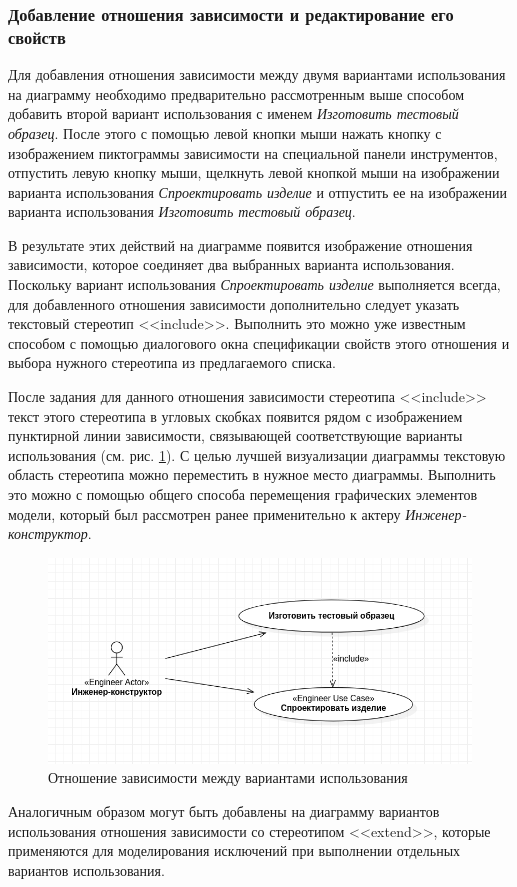 \documentclass[a4paper,12pt]{report}
\begin{document}
\subsubsection*{Добавление отношения зависимости и редактирование его свойств}
Для добавления отношения зависимости между двумя вариантами использования на диаграмму необходимо предварительно рассмотренным выше способом добавить второй вариант использования с именем \textit{Изготовить тестовый образец}. После этого с помощью левой кнопки мыши нажать кнопку с изображением пиктограммы зависимости на специальной панели инструментов, отпустить левую кнопку мыши, щелкнуть левой кнопкой мыши на изображении варианта использования \textit{Спроектировать изделие} и отпустить ее на изображении варианта использования \textit{Изготовить тестовый образец}. 

В результате этих действий на диаграмме появится изображение отношения зависимости, которое соединяет два выбранных варианта использования.
Поскольку вариант использования \textit{Спроектировать изделие} выполняется всегда, для добавленного отношения зависимости дополнительно следует указать текстовый стереотип <<include>>. Выполнить это можно уже известным способом с помощью диалогового окна спецификации свойств этого отношения и выбора нужного стереотипа из предлагаемого списка.

После задания для данного отношения зависимости стереотипа <<include>> текст этого стереотипа в угловых скобках появится рядом с изображением пунктирной линии зависимости, связывающей соответствующие варианты использования (см. рис. \ref{fig:actionsinclude}). С целью лучшей визуализации диаграммы текстовую область стереотипа можно переместить в нужное место диаграммы. Выполнить это можно с помощью общего способа перемещения графических элементов модели, который был рассмотрен ранее применительно к актеру \textit{Инженер-конструктор}.
\newpage
\begin{figure}[h!]
	\centering
	\includegraphics[width=0.7\linewidth]{images/actionsinclude}
	\caption{Отношение зависимости между вариантами использования}
	\label{fig:actionsinclude}
\end{figure}
Аналогичным образом могут быть добавлены на диаграмму вариантов использования отношения зависимости со стереотипом <<extend>>, которые применяются для моделирования исключений при выполнении отдельных вариантов использования.
\end{document}
